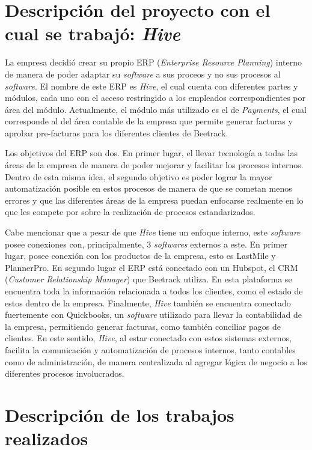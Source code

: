     
\section{Descripción del proyecto con el cual se trabajó: \textit{Hive}}
    
    La empresa decidió crear su propio ERP (\textit{Enterprise Resource Planning}) interno de manera de poder adaptar su \textit{software} a sus proceos y no sus procesos al \textit{software}. El nombre de este ERP es \textit{Hive}, el cual cuenta con diferentes partes y módulos, cada uno con el acceso restringido a los empleados correspondientes por área del módulo. Actualmente, el módulo más utilizado es el de \textit{Payments}, el cual corresponde al del área contable de la empresa que permite generar facturas y aprobar pre-facturas para los diferentes clientes de Beetrack.

    Los objetivos del ERP son dos. En primer lugar, el llevar tecnología a todas las áreas de la empresa de manera de poder mejorar y facilitar los procesos internos. Dentro de esta misma idea, el segundo objetivo es poder lograr la mayor automatización posible en estos procesos de manera de que se cometan menos errores y que las diferentes áreas de la empresa puedan enfocarse realmente en lo que les compete por sobre la realización de procesos estandarizados.
    
    Cabe mencionar que a pesar de que \textit{Hive} tiene un enfoque interno, este \textit{software} posee conexiones con, principalmente, 3 \textit{softwares} externos a este. En primer lugar, posee conexión con los productos de la empresa, esto es LastMile y PlannerPro. En segundo lugar el ERP está conectado con un Hubspot, el CRM (\textit{Customer Relationship Manager}) que Beetrack utiliza. En esta plataforma se encuentra toda la información relacionada a todos los clientes, como el estado de estos dentro de la empresa. Finalmente, \textit{Hive} también se encuentra conectado fuertemente con Quickbooks, un \textit{software} utilizado para llevar la contabilidad de la empresa, permitiendo generar facturas, como también conciliar pagos de clientes. En este sentido, \textit{Hive}, al estar conectado con estos sistemas externos, facilita la comunicación y automatización de procesos internos, tanto contables como de administración, de manera centralizada al agregar lógica de negocio a los diferentes procesos involucrados.


\section{Descripción de los trabajos realizados}

